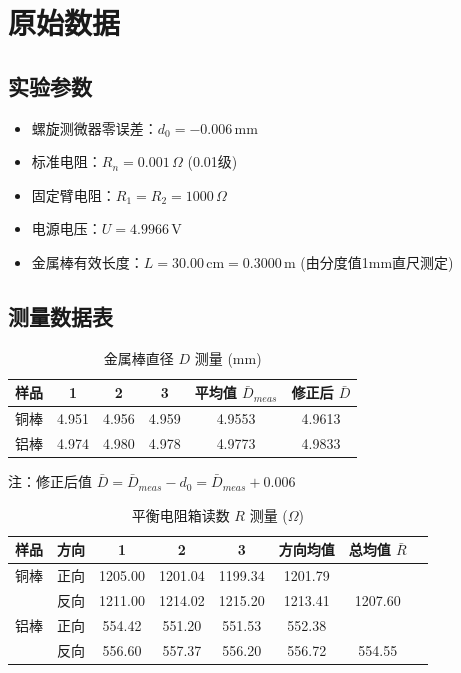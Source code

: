 \documentclass[12pt,a4paper]{article}
\begin{document}
\section{原始数据}
\subsection{实验参数}
\begin{itemize}
    \item 螺旋测微器零误差：$d_0 = -0.006\,\text{mm}$
    \item 标准电阻：$R_n = 0.001\,\Omega$ (0.01级)
    \item 固定臂电阻：$R_1 = R_2 = 1000\,\Omega$
    \item 电源电压：$U = 4.9966\,\text{V}$
    \item 金属棒有效长度：$L = 30.00\,\text{cm} = 0.3000\,\text{m}$ (由分度值1mm直尺测定)
\end{itemize}

\subsection{测量数据表}

\begin{table}[H]
    \centering
    \caption{金属棒直径 $D$ 测量 (mm)}
    \begin{tabular}{cccccc}
        \toprule
        样品 & 1 & 2 & 3 & 平均值 $\bar{D}_{meas}$ & 修正后 $\bar{D}$ \\
        \midrule
        铜棒 & 4.951 & 4.956 & 4.959 & 4.9553 & 4.9613 \\
        铝棒 & 4.974 & 4.980 & 4.978 & 4.9773 & 4.9833 \\
        \bottomrule
    \end{tabular}

    \small{注：修正后值 $\bar{D} = \bar{D}_{meas} - d_0 = \bar{D}_{meas} + 0.006$}
\end{table}

\begin{table}[H]
    \centering
    \caption{平衡电阻箱读数 $R$ 测量 ($\Omega$)}
    \begin{tabular}{cccccccc}
        \toprule
        样品 & 方向 & 1 & 2 & 3 & 方向均值 & 总均值 $\bar{R}$ \\
        \midrule
        铜棒 & 正向 & 1205.00 & 1201.04 & 1199.34 & 1201.79 & \\
             & 反向 & 1211.00 & 1214.02 & 1215.20 & 1213.41 & 1207.60 \\
        \midrule
        铝棒 & 正向 & 554.42 & 551.20 & 551.53 & 552.38 & \\
             & 反向 & 556.60 & 557.37 & 556.20 & 556.72 & 554.55 \\
        \bottomrule
    \end{tabular}
\end{table}
\end{document}
